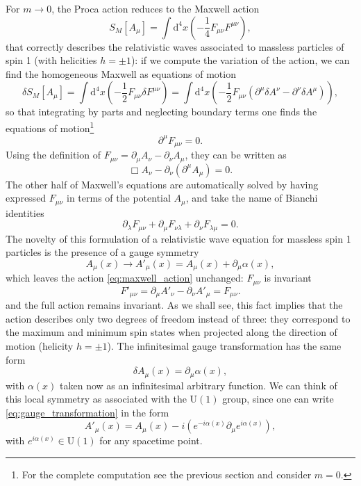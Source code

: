 For \(m \to 0\), the Proca action reduces to the Maxwell action
\begin{equation}
    S_M[A_\mu] = \int \mathrm{d}^4 x \left( -\frac{1}{4} F_{\mu \nu} F^{\mu \nu} \right),
    \label{eq:maxwell_action}
\end{equation}
that correctly describes the relativistic waves associated to massless particles of spin 1 (with helicities \(h=\pm 1\)): if we compute the variation of the action, we can find the homogeneous Maxwell as equations of motion
\[
    \delta S_M[A_\mu] = \int \mathrm{d}^4 x \left( -\frac{1}{2} F_{\mu \nu} \delta F^{\mu \nu} \right) = \int \mathrm{d}^4 x \left( -\frac{1}{2} F_{\mu \nu} (\partial^{\mu} \delta A^{\nu} - \partial^{\nu} \delta A^{\mu}) \right),
\]
so that integrating by parts and neglecting boundary terms one finds the equations of motion\footnote{For the complete computation see the previous section and consider \(m=0\).}
\[
    \partial^{\mu} F_{\mu \nu} = 0.
\]
Using the definition of \(F_{\mu \nu} = \partial_{\mu} A_{\nu} - \partial_{\nu}A_{\mu}\), they can be written as
\begin{equation}
    \Box A_\nu - \partial_\nu (\partial^{\mu} A_\mu) = 0.
    \label{eq:maxwell_equations_homogeneous}
\end{equation}
The other half of Maxwell’s equations are automatically solved by having expressed \(F_{\mu \nu}\) in terms of the potential \(A_\mu\), and take the name of Bianchi identities
\[
    \partial_{\lambda} F_{\mu \nu} + \partial_{\mu} F_{\nu \lambda} + \partial_{\nu} F_{\lambda \mu} = 0.
\]
The novelty of this formulation of a relativistic wave equation for massless spin 1 particles is the presence of a gauge symmetry
\begin{equation}
    A_\mu(x) \to A'_\mu(x) = A_\mu(x) + \partial_\mu \alpha(x),
    \label{eq:gauge_transformation}
\end{equation}
which leaves the action \eqref{eq:maxwell_action} unchanged: \(F_{\mu \nu}\) is invariant
\[
    F'_{\mu \nu} = \partial_{\mu} A'_{\nu} - \partial_{\nu} A'_{\mu} = F_{\mu \nu}.
\]
and the full action remains invariant. As we shall see, this fact implies that the action describes only two degrees of freedom instead of three: they correspond to the maximum and minimum spin states when projected along the direction of motion (helicity \(h=\pm 1\)). The infinitesimal gauge transformation has the same form
\[
    \delta A_\mu(x) = \partial_\mu \alpha(x),
\]
with \(\alpha(x)\) taken now as an infinitesimal arbitrary function. We can think of this local symmetry as associated with the \(\mathrm{U}(1)\) group, since one can write \eqref{eq:gauge_transformation} in the form
\[
    A'_\mu(x) = A_\mu(x) - i \left( e^{-i \alpha(x)} \partial_\mu e^{i \alpha(x)} \right),
\]
with \(e^{i \alpha(x)} \in \mathrm{U}(1)\) for any spacetime point.

